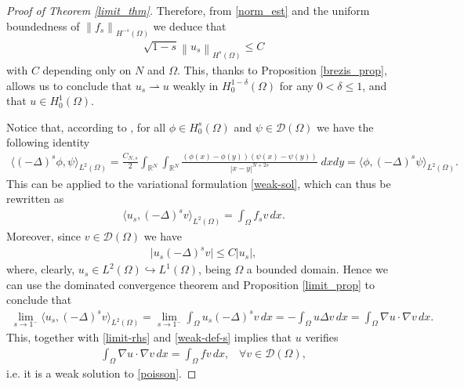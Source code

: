 \documentclass[reqno,twoside]{amsart}
\numberwithin{equation}{section}
\def\RR{{\mathbb{R}}}
\newcommand{\norm}[2]{{\left\|#1\right\|}_{#2}}
\newcommand{\fl}[2]{(-\Delta)^#1#2}
\begin{document}
\begin{proof}[Proof of Theorem \ref{limit_thm}]
Therefore, from \eqref{norm_est} and the uniform boundedness of $\norm{f_s}{H^{-s}(\Omega)}$ we deduce that 
\begin{align*}
	\sqrt{1-s}\norm{u_s}{H^s(\Omega)}\leq C
\end{align*}
with $C$ depending only on $N$ and $\Omega$. This, thanks to Proposition \ref{brezis_prop}, allows us to conclude that $u_s\rightharpoonup u$ weakly in $H^{1-\delta}_0(\Omega)$ for any $0<\delta\leq 1$, and that $u\in H_0^1(\Omega)$.

Notice that, according to \cite[Section 6]{warma2015fractional}, for all $\phi\in H_0^s(\Omega)$ and $\psi\in\mathcal{D}(\Omega)$ we have the following identity
\begin{align*}
	\big\langle \fl{s}{\phi},\psi\big\rangle_{L^2(\Omega)} =\frac{C_{N,s}}{2}\int_{\RR^N}\int_{\RR^N}\frac{(\phi(x)-\phi(y))(\psi(x)-\psi(y))}{|x-y|^{N+2s}}\;dxdy = \big\langle \phi,\fl{s}{\psi}\big\rangle_{L^2(\Omega)}.
\end{align*}
This can be applied to the variational formulation \eqref{weak-sol}, which can thus be rewritten as
\begin{align}\label{weak-def-s}
	\big\langle u_s,\fl{s}{v}\big\rangle_{L^2(\Omega)} = \int_\Omega f_sv\,dx.
\end{align}
Moreover, since $v\in\mathcal{D}(\Omega)$ we have
\begin{align*}
	\big|u_s\fl{s}{v}\big| \leq C|u_s|,
\end{align*}
where, clearly, $u_s\in L^2(\Omega)\hookrightarrow L^1(\Omega)$, being $\Omega$ a bounded domain. Hence we can use the dominated convergence theorem and Proposition \ref{limit_prop} to conclude that
\begin{align*}
	\lim_{s\to 1^-} \big\langle u_s,\fl{s}{v}\big\rangle_{L^2(\Omega)} = \lim_{s\to 1^-} \int_\Omega u_s\fl{s}{v}\,dx = -\int_\Omega u\Delta v\,dx = \int_\Omega \nabla u\cdot\nabla v\,dx.
\end{align*}
This, together with \eqref{limit-rhs} and \eqref{weak-def-s} implies that $u$ verifies
\begin{align*}
	\int_\Omega \nabla u\cdot\nabla v\,dx = \int_{\Omega} fv\,dx, \;\;\; \forall v\in\mathcal{D}(\Omega),
\end{align*}
i.e. it is a weak solution to \eqref{poisson}.
\end{proof}
\end{document}
